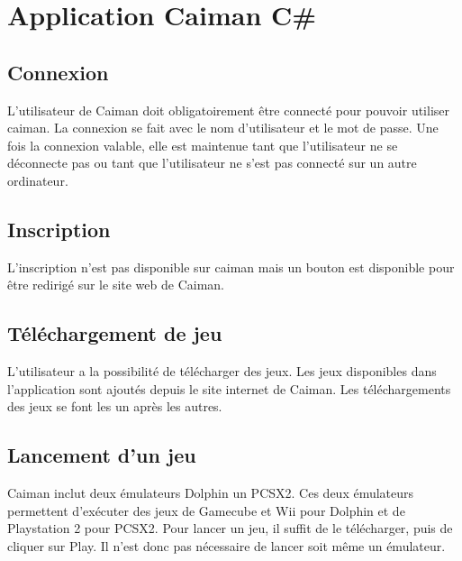 \documentclass[a4paper,12pt,french]{sphinxmanual}
\begin{document}
\chapter{Application  Caiman C\#}
\label{\detokenize{fonctionnelleC_:application-caiman-c}}\label{\detokenize{fonctionnelleC_::doc}}

\section{Connexion}
\label{\detokenize{fonctionnelleC_:connexion}}
\sphinxAtStartPar
L’utilisateur de Caiman doit obligatoirement être connecté pour pouvoir utiliser caiman. La connexion se fait avec le nom d’utilisateur et le mot de passe. Une fois la connexion valable, elle est maintenue tant que l’utilisateur ne se déconnecte pas ou tant que l’utilisateur ne s’est pas connecté sur un autre ordinateur.

\sphinxAtStartPar
{}


\section{Inscription}
\label{\detokenize{fonctionnelleC_:inscription}}
\sphinxAtStartPar
L’inscription n’est pas disponible sur caiman mais un bouton est disponible pour être redirigé sur le site web de Caiman.


\section{Téléchargement de jeu}
\label{\detokenize{fonctionnelleC_:telechargement-de-jeu}}
\sphinxAtStartPar
L’utilisateur a la possibilité de télécharger des jeux. Les jeux disponibles dans l’application sont ajoutés depuis le site internet de Caiman. Les téléchargements des jeux se font les un après les autres.

\sphinxAtStartPar
{}

\sphinxAtStartPar
{}


\section{Lancement d’un jeu}
\label{\detokenize{fonctionnelleC_:lancement-dun-jeu}}
\sphinxAtStartPar
Caiman inclut deux émulateurs Dolphin un PCSX2. Ces deux émulateurs permettent d’exécuter des jeux de Gamecube et Wii pour Dolphin et de Playstation 2 pour PCSX2. Pour lancer un jeu, il suffit de le télécharger, puis de cliquer sur Play. Il n’est donc pas nécessaire de lancer soit même un émulateur.
\end{document}
